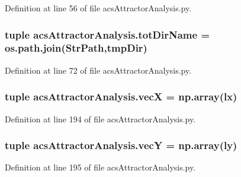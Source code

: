 Definition at line 56 of file acs\-Attractor\-Analysis.\-py.

\hypertarget{a00122_ad3caf9c42727aaab24f4ea4dae362fc9}{
\subsubsection[{tot\-Dir\-Name}]{\setlength{\rightskip}{0pt plus 5cm}tuple acs\-Attractor\-Analysis.\-tot\-Dir\-Name = os.\-path.\-join({\bf Str\-Path},tmp\-Dir)}}\label{a00122_ad3caf9c42727aaab24f4ea4dae362fc9}


Definition at line 72 of file acs\-Attractor\-Analysis.\-py.

\hypertarget{a00122_af20e9c92b7d977049b881882c0d1382c}{
\subsubsection[{vec\-X}]{\setlength{\rightskip}{0pt plus 5cm}tuple acs\-Attractor\-Analysis.\-vec\-X = np.\-array(lx)}}\label{a00122_af20e9c92b7d977049b881882c0d1382c}


Definition at line 194 of file acs\-Attractor\-Analysis.\-py.

\hypertarget{a00122_a691fb5bd87af2162b5acaf48ea4c06e7}{
\subsubsection[{vec\-Y}]{\setlength{\rightskip}{0pt plus 5cm}tuple acs\-Attractor\-Analysis.\-vec\-Y = np.\-array(ly)}}\label{a00122_a691fb5bd87af2162b5acaf48ea4c06e7}


Definition at line 195 of file acs\-Attractor\-Analysis.\-py.

